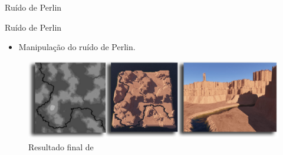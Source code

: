 \begin{frame}{Ruído de Perlin}
\end{frame}

\begin{frame}{Ruído de Perlin}
    \begin{itemize}\setlength\itemsep{1em}
        \item Manipulação do ruído de Perlin.  
    \end{itemize}
    \begin{figure}[H]
        \centering
        \includegraphics[width=.75\textwidth]{img/carliResult}
        \caption{Resultado final de \cite{carli2012canion}}
        \label{fig:carliResult}
    \end{figure}
    
\end{frame}